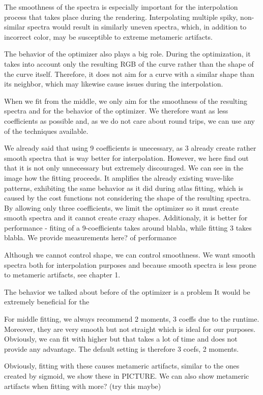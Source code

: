 The smoothness of the spectra is especially important for the interpolation process that takes place during the rendering. Interpolating multiple spiky, non-similar spectra would result in similarly uneven spectra, which, in addition to incorrect color, may be susceptible to extreme metameric artifacts.  

The behavior of the optimizer also plays a big role. During the optimization, it takes into account only the resulting RGB of the curve rather than the shape of the curve itself. Therefore, it does not aim for a curve with a similar shape than its neighbor, which may likewise cause issues during the interpolation.

When we fit from the middle, we only aim for the smoothness of the resulting spectra and for the behavior of the optimizer. We therefore want as less coefficients as possible and, as we do not care about round trips, we can use any of the techniques available.

We already said that using 9 coefficients is unecessary, as 3 already create rather smooth spectra that is way better for interpolation. However, we here find out that it is not only unnecessary but extremely discouraged. We can see in the image how the fitting proceeds. It amplifies the already existing wave-like patterns, exhibiting the same behavior as it did during atlas fitting, which is caused by the cost functions not considering the shape of the resulting spectra. By allowing only three coefficients, we limit the optimizer so it must create smooth spectra and it cannot create crazy shapes. Additionaly, it is better for performance - fiting of a 9-coefficients takes around blabla, while fitting 3 takes blabla. We provide measurements here? of performance

Although we cannot control shape, we can control smoothness. We want smooth spectra both for interpolation purposes and because smooth spectra is less prone to metameric artifacts, see chapter 1.

The behavior we talked about before of the optimizer is a problem 
It would be extremely beneficial for the

For middle fitting, we always recommend 2 moments, 3 coeffs due to the runtime. Moreover, they are very smooth but not straight which is ideal for our purposes. Obviously, we can fit with higher but that takes a lot of time and does not provide any advantage. The default setting is therefore 3 coefs, 2 moments.

Obviously, fitting with these causes metameric artifacts, similar to the ones created by sigmoid, we show these in PICTURE. We can also show metameric artifacts when fitting with more? (try this maybe)

